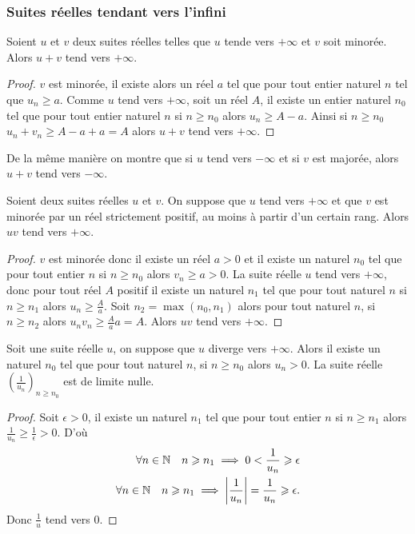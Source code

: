 \subsubsection{Suites réelles tendant vers l'infini}

\begin{prop}
  Soient $u$ et $v$ deux suites réelles telles que $u$ tende vers $+\infty$ et $v$ soit minorée. Alors $u+v$ tend vers $+\infty$.
\end{prop}
\begin{proof}
  $v$ est minorée, il existe alors un réel $a$ tel que pour tout entier naturel $n$ tel que $u_n \geqslant a$. Comme $u$ tend vers $+\infty$, soit un réel $A$, il existe un entier naturel $n_0$ tel que pour tout entier naturel $n$ si $n \geqslant n_0$ alors $u_n \geqslant A-a$. Ainsi si $n \geqslant n_0$ $u_n+v_n \geqslant A-a+a =A$ alors $u+v$ tend vers $+\infty$.
\end{proof}
\begin{prop}
  De la même manière on montre que si $u$ tend vers $-\infty$ et si $v$ est majorée, alors $u+v$ tend vers $-\infty$.
\end{prop}
\begin{prop}
  Soient deux suites réelles $u$ et $v$. On suppose que $u$ tend vers $+\infty$ et que $v$ est minorée par un réel strictement positif, au moins à partir d'un certain rang. Alors $uv$ tend vers $+\infty$.
\end{prop}
\begin{proof}
  $v$ est minorée donc il existe un réel $a>0$ et il existe un naturel $n_0$ tel que pour tout entier $n$ si $n \geqslant n_0$ alors $v_n \geqslant a > 0$. La suite réelle $u$ tend vers $+\infty$, donc pour tout réel $A$ positif il existe un naturel $n_1$ tel que pour tout naturel $n$ si $n \geqslant n_1$ alors $u_n \geqslant \frac{A}{a}$. Soit $n_2=\max(n_0,n_1)$ alors pour tout naturel $n$, si $n \geqslant n_2$ alors $u_nv_n \geqslant \frac{A}{a} a=A$. Alors $uv$ tend vers $+\infty$.
\end{proof}
\begin{prop}
  Soit une suite réelle $u$, on suppose que $u$ diverge vers $+\infty$. Alors il existe un naturel $n_0$ tel que pour tout naturel $n$, si $n \geqslant n_0$ alors $u_n>0$. La suite réelle $\left(\frac{1}{u_n}\right)_{n \geqslant n_0}$ est de limite nulle. 
\end{prop}
\begin{proof}
  Soit $\epsilon > 0$, il existe un naturel $n_1$ tel que pour tout entier $n$ si $n \geqslant n_1$ alors $\frac{1}{u_n} \geqslant \frac{1}{\epsilon} > 0$. D'où
  \begin{align}
    \forall n \in \mathbb{N} \quad n \geqslant n_1 \implies 0 < \frac{1}{u_n} \geqslant \epsilon \\
    \forall n \in \mathbb{N} \quad n \geqslant n_1 \implies \left\lvert\frac{1}{u_n}\right\rvert= \frac{1}{u_n} \geqslant \epsilon.
  \end{align}
  Donc $\frac{1}{u}$ tend vers 0.
\end{proof}
